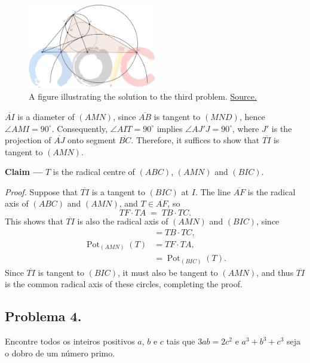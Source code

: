 \documentclass[12pt]{article}
\begin{document}
\begin{figure}[h]
  \centering
  \includegraphics[width=0.5\textwidth]{fourth.png}
  \caption{A figure illustrating the solution to the third problem. \href{https://noic.com.br/wp-content/uploads/2025/03/Solucoes_do_TM2_2024_Nivel_A.pdf}{Source.}}
\end{figure}

$\overline{AI}$ is a diameter of $(AMN)$, since $\overline{AB}$ is tangent to $(MND)$,
hence $\angle AMI = 90^\circ$. Consequently, $\angle AIT = 90^\circ$ implies
$\angle AJ'J = 90^\circ$, where $J'$ is the projection of $\overline{AJ}$ onto
segment $\overline{BC}$. Therefore, it suffices to show that $\overline{TI}$ is tangent
to $(AMN)$.

\begin{tcolorbox}[claimbox={Claim}]
  \textbf{\sffamily\textcolor{color1}{Claim ---}} $T$ is the radical centre of $(ABC)$, $(AMN)$ and $(BIC)$.
\end{tcolorbox}

\textit{Proof.} Suppose that $\overline{TI}$ is a tangent to $(BIC)$ at $I$.
The line $\overline{AF}$ is the radical axis of $(ABC)$ and $(AMN)$, and $T\in\overline{AF}$,
so 
\[
  TF \cdot TA \;=\; TB \cdot TC.
\]
This shows that $\overline{TI}$ is also the radical axis of $(AMN)$ and $(BIC)$, since
\begin{align*}
                                 &= TB \cdot TC, \\
  \operatorname{Pot}_{(AMN)}(T) &= TF \cdot TA, \\
                                 &= \operatorname{Pot}_{(BIC)}(T).
\end{align*}
Since $\overline{TI}$ is tangent to $(BIC)$, it must also be tangent to $(AMN)$, and thus
$\overline{TI}$ is the common radical axis of these circles, completing the proof.


    \subsection{Problema 4.}
      \begin{tcolorbox}[problembox={Enunciado do problema}]
        Encontre todos os inteiros positivos $a$, $b$ e $c$ tais que $3ab = 2c^2$
        e $ a^3 + b^3 + c^3$ seja o dobro de um número primo.
      \end{tcolorbox}
\end{document}
